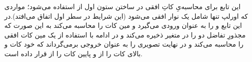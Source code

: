 \documentclass[a4paper,12pt]{article}
\begin{document}
      \subsubsection*{}
     این تابع برای محاسبه‌یِ کاتِ افقی در ساختن ستون اول از 
     استفاده می‌شود؛‌ مواردی که اورلپ تنها شامل یک نوار افقی می‌شود (این شرایط در سطر اول اتفاق می‌افتد).در این تابع 
     و
     را به عنوان ورودی می‌گیرد و مین کات را محاسبه می‌کند به این صورت که مجذورِ تفاضل دو 
     را در متغیر 
     ذخیره می‌کند و در ادامه با استفاده از 
     یک مین کات افقی را محاسبه می‌کند و در نهایت تصویری را به عنوان خروجی بر‌می‌گرداند که خود کات و بالای کات را از 
     و پایین کات را از 
     قرار داده است.
\end{document}
